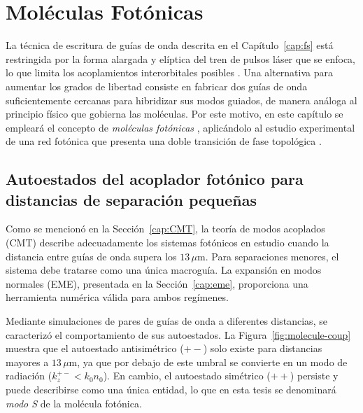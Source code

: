 \chapter{Moléculas Fotónicas \label{cap:molecules}}

La técnica de escritura de guías de onda descrita en el Capítulo~\ref{cap:fs} está restringida por la forma alargada y elíptica del tren de pulsos láser que se enfoca, lo que limita los acoplamientos interorbitales posibles \citep{interorbital}. Una alternativa para aumentar los grados de libertad consiste en fabricar dos guías de onda suficientemente cercanas para hibridizar sus modos guiados, de manera análoga al principio físico que gobierna las moléculas. Por este motivo, en este capítulo se empleará el concepto de \textit{moléculas fotónicas} \citep{molecules}, aplicándolo al estudio experimental de una red fotónica que presenta una doble transición de fase topológica \citep{SPSSH}.

\section{Autoestados del acoplador fotónico para distancias de separación pequeñas}

Como se mencionó en la Sección~\ref{cap:CMT}, la teoría de modos acoplados (CMT) describe adecuadamente los sistemas fotónicos en estudio cuando la distancia entre guías de onda supera los $13\,\mu$m. Para separaciones menores, el sistema debe tratarse como una única macroguía. La expansión en modos normales (EME), presentada en la Sección~\ref{cap:eme}, proporciona una herramienta numérica válida para ambos regímenes. 

Mediante simulaciones de pares de guías de onda a diferentes distancias, se caracterizó el comportamiento de sus autoestados. La Figura~\ref{fig:molecule-coup} muestra que el autoestado antisimétrico ($+-$) solo existe para distancias mayores a $13\,\mu$m, ya que por debajo de este umbral se convierte en un modo de radiación ($k_z^{+-} < k_0 n_0$). En cambio, el autoestado simétrico ($++$) persiste y puede describirse como una única entidad, lo que en esta tesis se denominará \textit{modo S} de la molécula fotónica.

